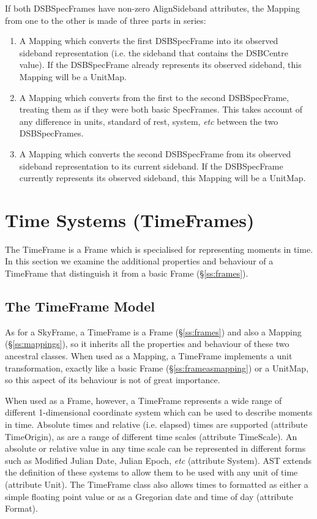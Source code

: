 \documentclass[twoside,11pt]{starlink}
\providecommand{\secref}[1]{\S\ref{#1}}
\begin{document}
If both DSBSpecFrames have non-zero AlignSideband attributes, the Mapping
from one to the other is made of three parts in series:

\begin{enumerate}
\item A Mapping which converts the first DSBSpecFrame into its observed
sideband representation (i.e. the sideband that contains the DSBCentre
value). If the DSBSpecFrame already represents its observed sideband, this
Mapping will be a UnitMap.
\item A Mapping which converts from the first to the second DSBSpecFrame,
treating them as if they were both basic SpecFrames. This takes account of
any difference in units, standard of rest, system, \emph{etc} between the
two DSBSpecFrames.
\item A Mapping which converts the second DSBSpecFrame from its observed
sideband representation to its current sideband. If the DSBSpecFrame
currently represents its observed sideband, this Mapping will be a UnitMap.
\end{enumerate}




\cleardoublepage
\section{\label{ss:timeframes}Time Systems (TimeFrames)}

The TimeFrame is a Frame which is specialised for representing moments in
time. In this section we examine the additional properties and behaviour of a
TimeFrame that distinguish it from a basic Frame (\secref{ss:frames}).

\subsection{The TimeFrame Model}

As for a SkyFrame, a TimeFrame is a Frame (\secref{ss:frames}) and also a
Mapping (\secref{ss:mappings}), so it inherits all the properties and
behaviour of these two ancestral classes.  When used as a Mapping, a
TimeFrame implements a unit transformation, exactly like a basic Frame
(\secref{ss:frameasmapping}) or a UnitMap, so this aspect of its
behaviour is not of great importance.

When used as a Frame, however, a TimeFrame represents a wide range of
different 1-dimensional coordinate system which can be used to describe
moments in time. Absolute times and relative (i.e. elapsed) times are
supported (attribute TimeOrigin), as are a range of different time scales
(attribute TimeScale). An absolute or relative value in any time scale can
be represented in different forms such as Modified Julian Date, Julian Epoch,
\emph{etc} (attribute System). AST extends the definition of these systems to
allow them to be used with any unit of time (attribute Unit). The TimeFrame
class also allows times to formatted as either a simple floating point value
or as a Gregorian date and time of day (attribute Format).
\end{document}
